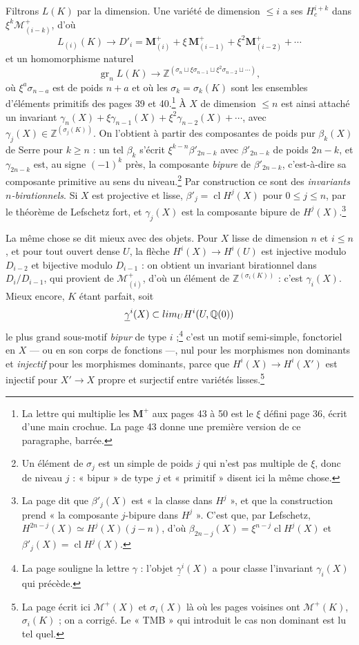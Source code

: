 \documentclass[11pt,a4paper]{article}
\begin{document}
Filtrons $L(K)$ par la dimension. Une variété de dimension $\leqslant i$ a ses
$H^{i+k}_{c}$ dans $\xi^{k}\mathcal{M}^{+}_{(i-k)}$, d'où
\[
L_{(i)}(K) \longrightarrow D'_{i} = \mathbf{M}^{+}_{(i)} + \xi\,\mathbf{M}^{+}_{(i-1)}
+ \xi^{2}\mathbf{M}^{+}_{(i-2)} + \cdots
\]
et un homomorphisme naturel
\[
\operatorname{gr}_{n} L(K) \longrightarrow
\mathbb{Z}^{(\sigma_{n} \sqcup \xi\sigma_{n-1} \sqcup \xi^{2}\sigma_{n-2} \sqcup \cdots)} ,
\]
où $\xi^{a}\sigma_{n-a}$ est de poids $n+a$ et où les $\sigma_{k} = \sigma_{k}(K)$
sont les ensembles d'éléments primitifs des pages 39 et 40.\footnote{La lettre
qui multiplie les $\mathbf{M}^{+}$ aux pages 43 à 50 est le $\xi$ défini page 36,
écrit d'une main crochue. La page 43 donne une première version de ce paragraphe,
barrée.}
À $X$ de dimension $\leqslant n$ est ainsi attaché un invariant
$\gamma_{n}(X) + \xi\gamma_{n-1}(X) + \xi^{2}\gamma_{n-2}(X) + \cdots$, avec
$\gamma_{j}(X) \in \mathbb{Z}^{(\sigma_{j}(K))}$. On l'obtient à partir des
composantes de poids pur $\beta_{k}(X)$ de Serre pour $k \geqslant n$ : un tel
$\beta_{k}$ s'écrit $\xi^{k-n}\beta'_{2n-k}$ avec $\beta'_{2n-k}$ de poids $2n-k$,
et $\gamma_{2n-k}$ est, au signe $(-1)^{k}$ près, la composante \emph{bipure} de
$\beta'_{2n-k}$, c'est-à-dire sa composante primitive au sens du
niveau.\footnote{Un élément de $\sigma_{j}$ est un simple de poids $j$ qui n'est
pas multiple de $\xi$, donc de niveau $j$ : « bipur » de type $j$ et
« primitif » disent ici la même chose.} Par construction ce sont des \emph{invariants $n$-birationnels}.
Si $X$ est projective et lisse, $\beta'_{j} = \operatorname{cl}H^{j}(X)$ pour
$0 \leqslant j \leqslant n$, par le théorème de Lefschetz fort, et $\gamma_{j}(X)$
est la composante bipure de $H^{j}(X)$.\footnote{La
page dit que $\beta'_{j}(X)$ est « la classe dans $H^{j}$ », et que la
construction prend « la composante $j$-bipure dans $H^{j}$ ». C'est que, par
Lefschetz, $H^{2n-j}(X) \simeq H^{j}(X)(j-n)$, d'où $\beta_{2n-j}(X) =
\xi^{n-j}\operatorname{cl}H^{j}(X)$ et $\beta'_{j}(X) = \operatorname{cl}H^{j}(X)$.}

La même chose se dit mieux avec des objets. Pour $X$ lisse de dimension $n$ et
$i \leqslant n$, et pour tout ouvert dense $U$, la flèche $H^{i}(X) \to H^{i}(U)$
est injective modulo $D_{i-2}$ et bijective modulo $D_{i-1}$ : on obtient un
invariant birationnel dans $D_{i}/D_{i-1}$, qui provient de
$\mathcal{M}^{+}_{(i)}$, d'où un élément de $\mathbb{Z}^{(\sigma_{i}(K))}$ :
c'est $\gamma_{i}(X)$. Mieux encore, $K$ étant parfait, soit
\[
\underline{\gamma}^{i}(X) \subset \varinjlim_{U} H^{i}(U, \mathbb{Q}(0))
\]
le plus grand sous-motif \emph{bipur} de type $i$ ;\footnote{La page souligne la
lettre $\gamma$ : l'objet $\underline{\gamma}^{i}(X)$ a pour classe l'invariant
$\gamma_{i}(X)$ qui précède.} c'est un motif semi-simple,
fonctoriel en $X$ --- ou en son corps de fonctions ---, nul pour les morphismes
non dominants et \emph{injectif} pour les morphismes dominants, parce que
$H^{i}(X) \to H^{i}(X')$ est injectif pour $X' \to X$ propre et surjectif entre
variétés lisses.\footnote{La page écrit ici $\mathcal{M}^{+}(X)$ et $\sigma_{i}(X)$
là où les pages voisines ont $\mathcal{M}^{+}(K)$, $\sigma_{i}(K)$ ; on a corrigé.
Le « TMB » qui introduit le cas non dominant est lu tel quel.}
\end{document}
